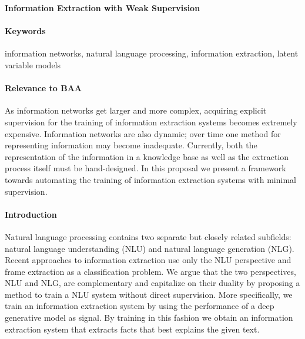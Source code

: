 \documentclass[11pt]{article}
\begin{document}

\begin{center}
\textbf{Information Extraction with Weak Supervision}
\end{center}

\begin{comment}
Spectrum from hard attention => hard segmental => HSMM for generative model, coverage / recall
Should we go into HSMM??? or is hard segmental attention enough

composition function = categorical over two entries of x

structured attention for IE posterior?
\end{comment}

\paragraph{Keywords}
information networks, natural language processing, information extraction,
latent variable models

\paragraph{Relevance to BAA}
As information networks get larger and more complex,
acquiring explicit supervision for the training of information extraction systems
becomes extremely expensive.
Information networks are also dynamic;
over time one method for representing information may become inadequate.
Currently, both the representation of the information in a knowledge base
as well as the extraction process itself must be hand-designed.
In this proposal we present a framework towards automating the
training of information extraction systems with minimal supervision.

\paragraph{Introduction}
Natural language processing contains two separate but
closely related subfields: natural language understanding (NLU) and natural language
generation (NLG).
Recent approaches to information extraction use only the NLU perspective
and frame extraction as a classification problem.
We argue that the two perspectives, NLU and NLG, are complementary
and capitalize on their duality by proposing a method to train a NLU system
without direct supervision.
More specifically, we train an information extraction system by using
the performance of a deep generative model as signal.
By training in this fashion we obtain an information extraction system
that extracts facts that best explains the given text.
\end{document}
